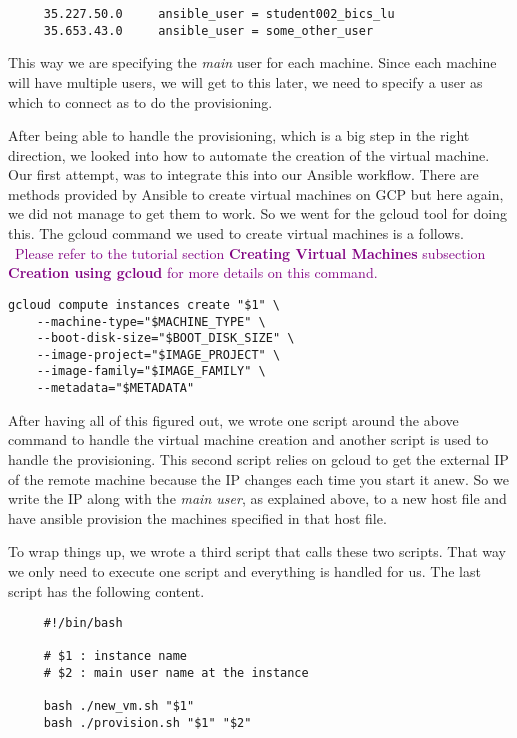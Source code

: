 \begin{verbatim}
	 35.227.50.0	 ansible_user = student002_bics_lu
	 35.653.43.0	 ansible_user = some_other_user
\end{verbatim}

This way we are specifying the \textit{main} user for each machine.
Since each machine will have multiple users, we will get to this
later, we need to specify a user as which to connect as to do the
provisioning. 

After being able to handle the provisioning, which is a big step in
the right direction, we looked into how to automate the creation of
the virtual machine. Our first attempt, was to integrate this into our
Ansible workflow. There are methods provided by Ansible to create
virtual machines on GCP but here again, we did not manage to get them
to work. So we went for the gcloud tool for doing this. The gcloud
command we used to create virtual machines is a follows.
\
\textcolor{purple}{Please refer to the tutorial section
\textbf{Creating Virtual Machines} subsection \textbf{Creation using
gcloud} for more details on this command.}

\begin{verbatim}
gcloud compute instances create "$1" \
    --machine-type="$MACHINE_TYPE" \
    --boot-disk-size="$BOOT_DISK_SIZE" \
    --image-project="$IMAGE_PROJECT" \
    --image-family="$IMAGE_FAMILY" \
    --metadata="$METADATA" 
\end{verbatim}

After having all of this figured out, we wrote one script around the
above command to handle the virtual machine creation and another
script is used to handle the provisioning. This second script relies
on gcloud to get the external IP of the remote machine because the IP
changes each time you start it anew. So we write the IP along with the
\textit{main user}, as explained above, to a new host file and have
ansible provision the machines specified in that host file.

To wrap things up, we wrote a third script that calls these two
scripts. That way we only need to execute one script and everything is
handled for us. The last script has the following content.

\begin{verbatim}
	 #!/bin/bash
	 
	 # $1 : instance name
	 # $2 : main user name at the instance
	 
	 bash ./new_vm.sh "$1"
	 bash ./provision.sh "$1" "$2"
\end{verbatim}
